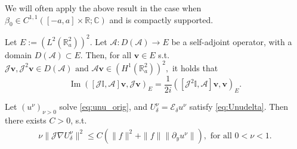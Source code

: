 \documentclass[10pt,a4paper]{amsart}
\renewcommand{\Im}{\operatorname{Im}}
\renewcommand{\vec}[1]{\mathbf{#1}}
\begin{document}
\begin{remark}
	\label{rem:regularity}
We will often apply the above result in the case when $\beta_0\in C^{1,1}([-a,a]\times\mathbb{R}; \mathbb{C})$ and is compactly supported.
\end{remark}

\begin{lemma}
	\label{lem:self_adjoint_commutator}
	Let $E:=(L^2(\mathbb{R}^2_a))^2$. 
	Let $\mathcal{A}: D(\mathcal{A})\rightarrow E$ be a self-adjoint operator, with a domain $D(\mathcal{A})\subset E$. Then, for all $\vec{v}\in E$ s.t. $\mathcal{J}\vec{v}, \mathcal{J}^2\vec{v}\in D(\mathcal{A}) \text{  and   }\mathcal{A}\vec{v}\in \left(H^1(\mathbb{R}^2_a)\right)^2,$ it holds that $$\Im ([\mathcal{J}\mathbb{I}, \mathcal{A}]\vec{v},\mathcal{J} \vec{v})_{E}=\frac{1}{2i}([\mathcal{J}^2\mathbb{I}, \mathcal{A}]\vec{v},\vec{v})_{E}.$$ 
\end{lemma}

\begin{proposition}
	\label{proposition:jbound_basic}
	Let $(u^{\nu})_{\nu>0}$ solve \eqref{eq:unu_orig},  and $U^{\nu}_{\delta}=\mathcal{E}_{\delta}u^{\nu}$ satisfy \eqref{eq:Unudelta}. Then there exists $C>0$, s.t.  
	\begin{align}
		\label{eq:lemboundnu}
		\nu\|\mathcal{J}\nabla U^{\nu}_{\delta}\|^2\leq C \left(\|f\|^2+
		\|f\|\|\partial_y u^{\nu}\|\right), \text{ for all }0<\nu<1.
	\end{align}
\end{proposition}
\end{document}
